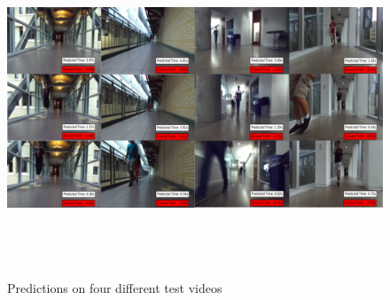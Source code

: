     \begin{figure}[ht]
      \centering
      \includegraphics[height=10cm,width=\textwidth]{figs/qr2.pdf}
      \caption{Predictions on four different test videos}
      \label{fig:testVideos}
  \end{figure}


